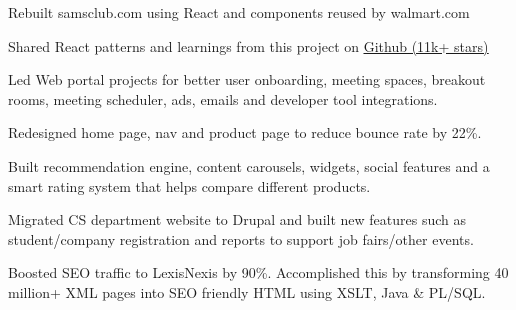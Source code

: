 \documentclass[]{my-resume-openfont}
\begin{document}
\begin{minipage}[t]{0.66\textwidth}
\begin{tightemize}
\item Rebuilt samsclub.com using React and components reused by walmart.com
\item Shared React patterns and learnings from this project on \href{https://github.com/vasanthk/react-bits}{\underline{Github (11k+ stars)}}
\vspace{1mm} %
\end{tightemize}

\sectionsep

\begin{tightemize}
\item Led Web portal projects for better user onboarding, meeting spaces, breakout rooms, meeting scheduler, ads, emails and developer tool integrations.
\end{tightemize}
\sectionsep

\begin{tightemize}
\item Redesigned home page, nav and product page to reduce bounce rate by 22\%.
\item Built recommendation engine, content carousels, widgets, social features and a smart rating system that helps compare different products.
\end{tightemize}
\sectionsep

\begin{tightemize}
\item Migrated CS department website to Drupal and built new features such as student/company registration and reports to support job fairs/other events.
\end{tightemize}
\sectionsep

\begin{tightemize}
\item Boosted SEO traffic to LexisNexis by 90\%. Accomplished this by transforming 40 million+ XML pages into SEO friendly HTML using XSLT, Java \& PL/SQL.
\end{tightemize}


\end{minipage}
\end{document}
